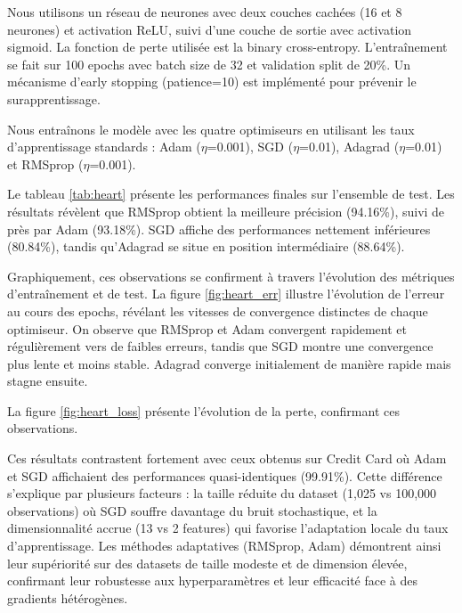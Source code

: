 \documentclass[a4paper,12pt]{article}
\begin{document}
Nous utilisons un réseau de neurones avec deux couches cachées (16 et 8 neurones) et activation ReLU, suivi d'une couche de sortie avec activation sigmoid. La fonction de perte utilisée est la binary cross-entropy. L'entraînement se fait sur 100 epochs avec batch size de 32 et validation split de 20\%. Un mécanisme d'early stopping (patience=10) est implémenté pour prévenir le surapprentissage.

Nous entraînons le modèle avec les quatre optimiseurs en utilisant les taux d'apprentissage standards : Adam ($\eta$=0.001), SGD ($\eta$=0.01), Adagrad ($\eta$=0.01) et RMSprop ($\eta$=0.001). \\

\par Le tableau \ref{tab:heart} présente les performances finales sur l'ensemble de test. Les résultats révèlent que RMSprop obtient la meilleure précision (94.16\%), suivi de près par Adam (93.18\%). SGD affiche des performances nettement inférieures (80.84\%), tandis qu'Adagrad se situe en position intermédiaire (88.64\%). \\

\par Graphiquement, ces observations se confirment à travers l'évolution des métriques d'entraînement et de test. La figure \ref{fig:heart_err} illustre l'évolution de l'erreur au cours des epochs, révélant les vitesses de convergence distinctes de chaque optimiseur. On observe que RMSprop et Adam convergent rapidement et régulièrement vers de faibles erreurs, tandis que SGD montre une convergence plus lente et moins stable. Adagrad converge initialement de manière rapide mais stagne ensuite. \\

\par La figure \ref{fig:heart_loss} présente l'évolution de la perte, confirmant ces observations.

\par Ces résultats contrastent fortement avec ceux obtenus sur Credit Card où Adam et SGD affichaient des performances quasi-identiques (99.91\%). Cette différence s'explique par plusieurs facteurs : la taille réduite du dataset (1,025 vs 100,000 observations) où SGD souffre davantage du bruit stochastique, et la dimensionnalité accrue (13 vs 2 features) qui favorise l'adaptation locale du taux d'apprentissage. Les méthodes adaptatives (RMSprop, Adam) démontrent ainsi leur supériorité sur des datasets de taille modeste et de dimension élevée, confirmant leur robustesse aux hyperparamètres et leur efficacité face à des gradients hétérogènes.
\end{document}
